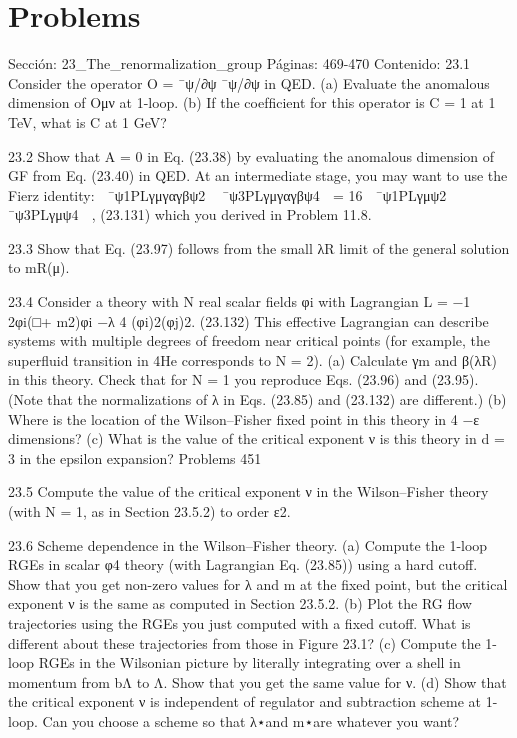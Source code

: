 \section*{Problems}
Sección: 23_The_renormalization_group
Páginas: 469-470
Contenido:
23.1 Consider the operator O = ¯ψ/∂ψ ¯ψ/∂ψ in QED.
(a) Evaluate the anomalous dimension of Oμν at 1-loop.
(b) If the coefﬁcient for this operator is C = 1 at 1 TeV, what is C at 1 GeV?

23.2 Show that A = 0 in Eq. (23.38) by evaluating the anomalous dimension of GF from
Eq. (23.40) in QED. At an intermediate stage, you may want to use the Fierz identity:
 ¯ψ1PLγμγαγβψ2
 ¯ψ3PLγμγαγβψ4

= 16
 ¯ψ1PLγμψ2
 ¯ψ3PLγμψ4

,
(23.131)
which you derived in Problem 11.8.

23.3 Show that Eq. (23.97) follows from the small λR limit of the general solution to
mR(μ).

23.4 Consider a theory with N real scalar ﬁelds φi with Lagrangian
L = −1
2φi(□+ m2)φi −λ
4 (φi)2(φj)2.
(23.132)
This effective Lagrangian can describe systems with multiple degrees of freedom
near critical points (for example, the superﬂuid transition in 4He corresponds to
N = 2).
(a) Calculate γm and β(λR) in this theory. Check that for N = 1 you reproduce
Eqs. (23.96) and (23.95). (Note that the normalizations of λ in Eqs. (23.85)
and (23.132) are different.)
(b) Where is the location of the Wilson–Fisher ﬁxed point in this theory in 4 −ε
dimensions?
(c) What is the value of the critical exponent ν is this theory in d = 3 in the epsilon
expansion?
Problems
451

23.5 Compute the value of the critical exponent ν in the Wilson–Fisher theory (with N =
1, as in Section 23.5.2) to order ε2.

23.6 Scheme dependence in the Wilson–Fisher theory.
(a) Compute the 1-loop RGEs in scalar φ4 theory (with Lagrangian Eq. (23.85))
using a hard cutoff. Show that you get non-zero values for λ and m at the ﬁxed
point, but the critical exponent ν is the same as computed in Section 23.5.2.
(b) Plot the RG ﬂow trajectories using the RGEs you just computed with a ﬁxed
cutoff. What is different about these trajectories from those in Figure 23.1?
(c) Compute the 1-loop RGEs in the Wilsonian picture by literally integrating over
a shell in momentum from bΛ to Λ. Show that you get the same value for ν.
(d) Show that the critical exponent ν is independent of regulator and subtraction
scheme at 1-loop. Can you choose a scheme so that λ⋆and m⋆are whatever you
want?

